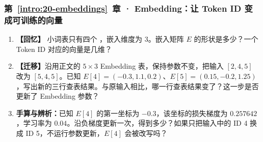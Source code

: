 \subsubsection*{第~\ref*{intro:20-embeddings}~章 · Embedding：让 Token ID 变成可训练的向量}
\begin{enumerate}[label={},leftmargin=4.8em,itemsep=4pt]
\item[\textbf{C-047.}] \leavevmode{}\label{exercise:C-047}\label{exercise:embedding-shape}\label{exercise:linked-20-embeddings}  \textbf{【回忆】} 小词表只有四个 ，嵌入维度为 3。嵌入矩阵 $E$ 的形状是多少？一个 Token ID 对应的向量是几维？
\item[\textbf{C-048.}] \leavevmode{}\label{exercise:C-048}\label{exercise:embedding-input-change}\textbf{【迁移】}沿用正文的 $5\times3$ Embedding 表，保持参数不变，把输入 $[2,4,5]$ 改为 $[5,4,5]$。已知 $E[4]=(-0.3,1.1,0.2)$、$E[5]=(0.15,-0.2,1.25)$，写出新的三行查表结果。与原输入相比，哪一行查表结果变了？这一步是否更新了 Embedding 参数？
\item[\textbf{C-049.}] \leavevmode{}\label{exercise:C-049}\label{exercise:embedding-update}\textbf{手算与辨析：}已知 $E[4]$ 的第一坐标为 $-0.3$，该坐标的损失梯度为 $0.257642$，学习率为 $0.04$。沿负梯度更新一次，得到多少？如果只把输入中的 ID 4 换成 ID 5，不运行参数更新，$E[4]$ 会被改写吗？
\end{enumerate}
